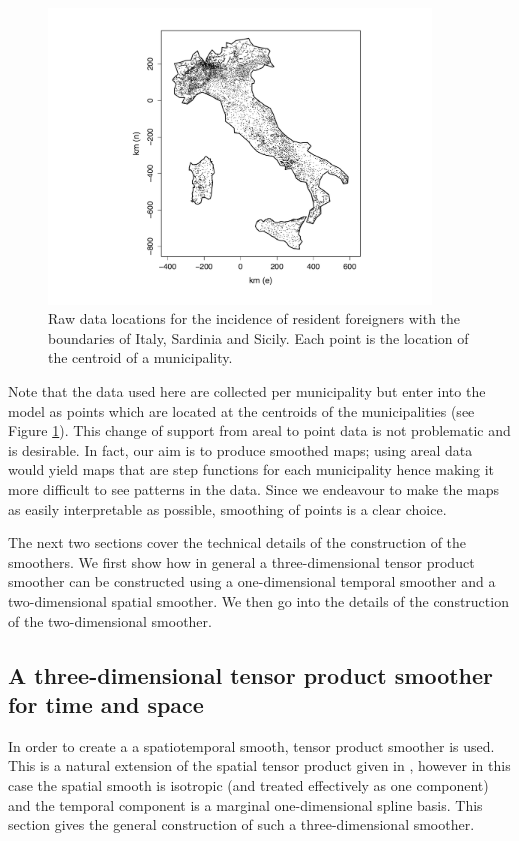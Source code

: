 \begin{figure}[tbp]
	\centering
		\includegraphics[width=4in]{it/pointmap.pdf}
	\caption{Raw data locations for the incidence of resident foreigners with the boundaries of Italy, Sardinia and Sicily. Each point is the location of the centroid of a municipality.}
	\label{pointmap}
\end{figure}

Note that the data used here are collected per municipality but enter into the model as points which are located at the centroids of the municipalities (see Figure \ref{pointmap}). This change of support from areal to point data is not problematic and is desirable. In fact, our aim is to produce smoothed maps; using areal data would yield maps that are step functions for each municipality hence making it more difficult to see patterns in the data. Since we endeavour to make the maps as easily interpretable as possible, smoothing of points is a clear choice.

The next two sections cover the technical details of the construction of the smoothers. We first show how in general a three-dimensional tensor product smoother can be constructed using a one-dimensional temporal smoother and a two-dimensional spatial smoother. We then go into the details of the construction of the two-dimensional smoother.

\subsection{A three-dimensional tensor product smoother for time and space \label{3D}}

In order to create a a spatiotemporal smooth, tensor product smoother is used. This is a natural extension of the spatial tensor product given in , however in this case the spatial smooth is isotropic (and treated effectively as one component) and the temporal component is  a marginal one-dimensional spline basis. This section gives the general construction of such a three-dimensional smoother.

